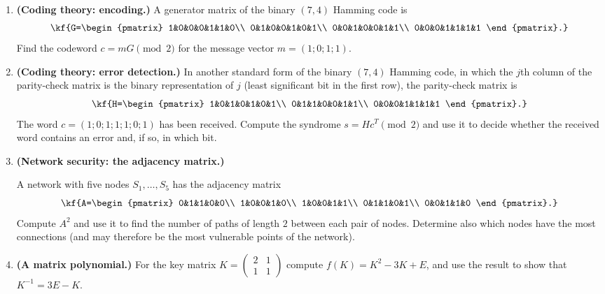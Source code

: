 \begin{enumerate}[label=\arabic*.,]
conclusion.
\item \textbf{(Coding theory: encoding.)} A generator matrix of the binary
$(7,4)$ Hamming code is
\[\kf{G=\begin{pmatrix}
1&0&0&0&1&1&0\\
0&1&0&0&1&0&1\\
0&0&1&0&0&1&1\\
0&0&0&1&1&1&1
\end{pmatrix}.}\]
Find the codeword $c=mG \pmod 2$ for the message vector $m=(1;0;1;1)$.
\item \textbf{(Coding theory: error detection.)} In another standard form of the
binary $(7,4)$ Hamming code, in which the $j$th column of the parity-check
matrix is the binary representation of $j$ (least significant bit in the first row), the parity-check matrix is
\[\kf{H=\begin{pmatrix}
1&0&1&0&1&0&1\\
0&1&1&0&0&1&1\\
0&0&0&1&1&1&1
\end{pmatrix}.}\]
The word $c=(1;0;1;1;1;0;1)$ has been received. Compute the syndrome
$s=Hc^{T}\pmod 2$ and use it to decide whether the received word contains an
error and, if so, in which bit.
\item \textbf{(Network security: the adjacency matrix.)}

A network with five nodes
$S_1,\dots,S_5$ has the adjacency matrix
\[\kf{A=\begin{pmatrix}
0&1&1&0&0\\
1&0&0&1&0\\
1&0&0&1&1\\
0&1&1&0&1\\
0&0&1&1&0
\end{pmatrix}.}\]
Compute $A^{2}$ and use it to find the number of paths of length $2$ between each
pair of nodes. Determine also which nodes have the most connections (and may
therefore be the most vulnerable points of the network).
\item \textbf{(A matrix polynomial.)} For the key matrix
$K=\begin{pmatrix}2 & 1\\ 1 & 1\end{pmatrix}$ compute $f(K)=K^2-3K+E$, and use
the result to show that $K^{-1}=3E-K$.
\end{enumerate}
